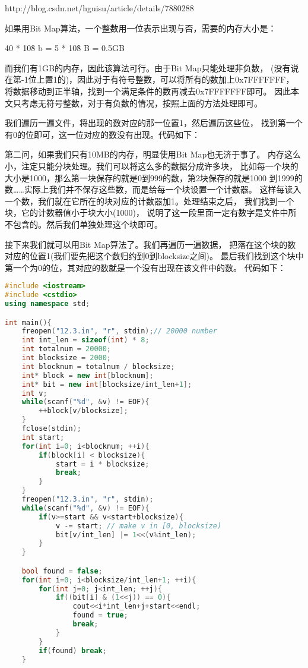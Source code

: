 \begin{description}
http://blog.csdn.net/hguisu/article/details/7880288

如果用Bit Map算法，一个整数用一位表示出现与否，需要的内存大小是：

40 * 10\^8 b = 5 * 10\^8 B = 0.5GB

而我们有1GB的内存，因此该算法可行。由于Bit Map只能处理非负数， (没有说在第-1位上置1的)，因此对于有符号整数，可以将所有的数加上0x7FFFFFFF， 将数据移动到正半轴，找到一个满足条件的数再减去0x7FFFFFFF即可。 因此本文只考虑无符号整数，对于有负数的情况，按照上面的方法处理即可。

我们遍历一遍文件，将出现的数对应的那一位置1，然后遍历这些位， 找到第一个有0的位即可，这一位对应的数没有出现。代码如下：


第二问，如果我们只有10MB的内存，明显使用Bit Map也无济于事了。 内存这么小，注定只能分块处理。我们可以将这么多的数据分成许多块， 比如每一个块的大小是1000，那么第一块保存的就是0到999的数，第2块保存的就是1000 到1999的数……实际上我们并不保存这些数，而是给每一个块设置一个计数器。 这样每读入一个数，我们就在它所在的块对应的计数器加1。处理结束之后， 我们找到一个块，它的计数器值小于块大小(1000)， 说明了这一段里面一定有数字是文件中所不包含的。然后我们单独处理这个块即可。

接下来我们就可以用Bit Map算法了。我们再遍历一遍数据， 把落在这个块的数对应的位置1(我们要先把这个数归约到0到blocksize之间)。 最后我们找到这个块中第一个为0的位，其对应的数就是一个没有出现在该文件中的数。 代码如下：
\begin{lstlisting}[language=C++]
#include <iostream>
#include <cstdio>
using namespace std;

int main(){
    freopen("12.3.in", "r", stdin);// 20000 number
    int int_len = sizeof(int) * 8;
    int totalnum = 20000;
    int blocksize = 2000;
    int blocknum = totalnum / blocksize;
    int* block = new int[blocknum];
    int* bit = new int[blocksize/int_len+1];
    int v;
    while(scanf("%d", &v) != EOF){
        ++block[v/blocksize];
    }
    fclose(stdin);
    int start;
    for(int i=0; i<blocknum; ++i){
        if(block[i] < blocksize){
            start = i * blocksize;
            break;
        }
    }
    freopen("12.3.in", "r", stdin);
    while(scanf("%d", &v) != EOF){
        if(v>=start && v<start+blocksize){
            v -= start; // make v in [0, blocksize)
            bit[v/int_len] |= 1<<(v%int_len);
        }
    }

    bool found = false;
    for(int i=0; i<blocksize/int_len+1; ++i){
        for(int j=0; j<int_len; ++j){
            if((bit[i] & (1<<j)) == 0){
                cout<<i*int_len+j+start<<endl;
                found = true;
                break;
            }
        }
        if(found) break;
    }


\end{lstlisting}
\end{description}

